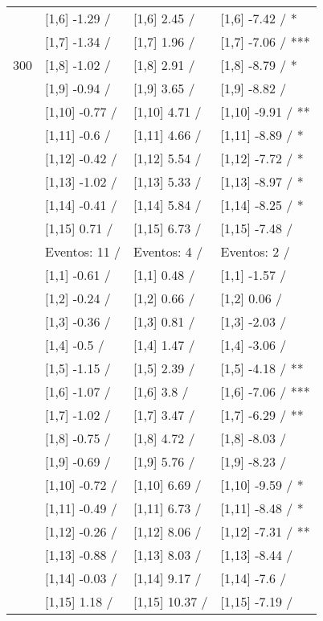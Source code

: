 \begin{table}
\begin{tabular}[t]{llll}
 & {}[1,6] -1.29  / & {}[1,6] 2.45  / & {}[1,6] -7.42  / *\\
 & {}[1,7] -1.34  / & {}[1,7] 1.96  / & {}[1,7] -7.06  / ***\\
300 & {}[1,8] -1.02  / & {}[1,8] 2.91  / & {}[1,8] -8.79  / *\\
\addlinespace
 & {}[1,9] -0.94  / & {}[1,9] 3.65  / & {}[1,9] -8.82  /\\
 & {}[1,10] -0.77  / & {}[1,10] 4.71  / & {}[1,10] -9.91  / **\\
 & {}[1,11] -0.6  / & {}[1,11] 4.66  / & {}[1,11] -8.89  / *\\
 & {}[1,12] -0.42  / & {}[1,12] 5.54  / & {}[1,12] -7.72  / *\\
 & {}[1,13] -1.02  / & {}[1,13] 5.33  / & {}[1,13] -8.97  / *\\
\addlinespace
 & {}[1,14] -0.41  / & {}[1,14] 5.84  / & {}[1,14] -8.25  / *\\
 & {}[1,15] 0.71  / & {}[1,15] 6.73  / & {}[1,15] -7.48  /\\
 & Eventos:  11 / & Eventos:  4 / & Eventos:  2 /\\
 & {}[1,1] -0.61  / & {}[1,1] 0.48  / & {}[1,1] -1.57  /\\
 & {}[1,2] -0.24  / & {}[1,2] 0.66  / & {}[1,2] 0.06  /\\
\addlinespace
 & {}[1,3] -0.36  / & {}[1,3] 0.81  / & {}[1,3] -2.03  /\\
 & {}[1,4] -0.5  / & {}[1,4] 1.47  / & {}[1,4] -3.06  /\\
 & {}[1,5] -1.15  / & {}[1,5] 2.39  / & {}[1,5] -4.18  / **\\
 & {}[1,6] -1.07  / & {}[1,6] 3.8  / & {}[1,6] -7.06  / ***\\
 & {}[1,7] -1.02  / & {}[1,7] 3.47  / & {}[1,7] -6.29  / **\\
\addlinespace
500 & {}[1,8] -0.75  / & {}[1,8] 4.72  / & {}[1,8] -8.03  /\\
 & {}[1,9] -0.69  / & {}[1,9] 5.76  / & {}[1,9] -8.23  /\\
 & {}[1,10] -0.72  / & {}[1,10] 6.69  / & {}[1,10] -9.59  / *\\
 & {}[1,11] -0.49  / & {}[1,11] 6.73  / & {}[1,11] -8.48  / *\\
 & {}[1,12] -0.26  / & {}[1,12] 8.06  / & {}[1,12] -7.31  / **\\
\addlinespace
 & {}[1,13] -0.88  / & {}[1,13] 8.03  / & {}[1,13] -8.44  /\\
 & {}[1,14] -0.03  / & {}[1,14] 9.17  / & {}[1,14] -7.6  /\\
 & {}[1,15] 1.18  / & {}[1,15] 10.37  / & {}[1,15] -7.19  /\\
\bottomrule
\end{tabular}
\end{table}
